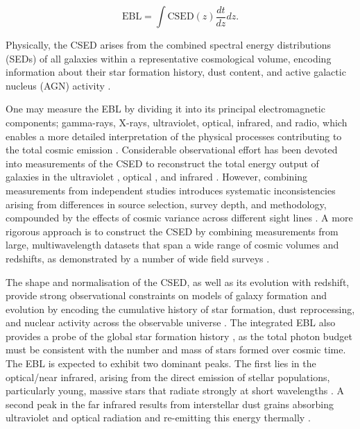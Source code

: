 \documentclass[
    a4paper, %
    10pt, %
    unnumberedsections, %
]{LTJournalArticle}
\begin{document}
\begin{equation}
    \mathrm{EBL} = \int \mathrm{CSED}(z)\frac{dt}{dz}dz.
\end{equation}

Physically, the CSED arises from the combined spectral energy distributions (SEDs) of all galaxies within a representative cosmological volume, encoding information about their star formation history, dust content, and active galactic nucleus (AGN) activity \parencite{andrewsModellingCosmicSpectral2018}.

One may measure the EBL by dividing it into its principal electromagnetic components; gamma-rays, X-rays, ultraviolet, optical, infrared, and radio, which enables a more detailed interpretation of the physical processes contributing to the total cosmic emission \parencite{hillSpectrumUniverse2018}. Considerable observational effort has been devoted into measurements of the CSED to reconstruct the total energy output of galaxies in the ultraviolet \parencite{wilsonStarFormationHistory2002,budavariUltravioletLuminosityFunction2005,wyderUltravioletGalaxyLuminosity2005,robothamGALEXSDSSNUV2011}, optical \parencite{norberg2dFGalaxyRedshift2002,blantonGalaxyLuminosityFunction2003,montero-dortaSDSSDR6Luminosity2009}, and infrared \parencite{kochanekKBandGalaxyLuminosity2001,cole2dFGalaxyRedshift2001,saunders60mFarinfraredLuminosity1990,marchettiHerMESSubmillimetreLocal2016}. However, combining measurements from independent studies introduces systematic inconsistencies arising from differences in source selection, survey depth, and methodology, compounded by the effects of cosmic variance across different sight lines \parencite{driverGalaxyMassAssembly2012,crossBivariateBrightnessFunction2002}. A more rigorous approach is to construct the CSED by combining measurements from large, multiwavelength datasets that span a wide range of cosmic volumes and redshifts, as demonstrated by a number of wide field surveys \parencite{hillUgrizYJHKLuminosityDistributions2010,driverGalaxyMassAssembly2011,andrewsModellingCosmicSpectral2018}. 

The shape and normalisation of the CSED, as well as its evolution with redshift, provide strong observational constraints on models of galaxy formation and evolution by encoding the cumulative history of star formation, dust reprocessing, and nuclear activity across the observable universe \parencite{dominguezExtragalacticBackgroundLight2011}. The integrated EBL also provides a probe of the global star formation history \parencite{fardalEvolutionaryHistoryStars2007}, as the total photon budget must be consistent with the number and mass of stars formed over cosmic time. The EBL is expected to exhibit two dominant peaks. The first lies in the optical/near infrared, arising from the direct emission of stellar populations, particularly young, massive stars that radiate strongly at short wavelengths \parencite{schlegelMapsDustInfrared1998}. A second peak in the far infrared results from interstellar dust grains absorbing ultraviolet and optical radiation and re-emitting this energy thermally \parencite{calzettiDustContentOpacity2000}. 
\end{document}
